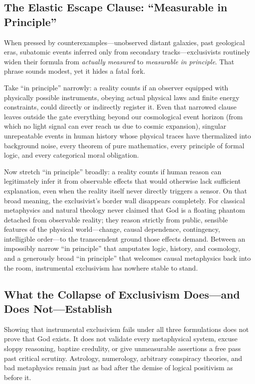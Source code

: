 \subsection{The Elastic Escape Clause: ``Measurable in Principle''}

When pressed by counterexamples---unobserved distant galaxies, past geological eras, subatomic events inferred only from secondary tracks---exclusivists routinely widen their formula from \emph{actually measured} to \emph{measurable in principle}. That phrase sounds modest, yet it hides a fatal fork.

Take ``in principle'' narrowly: a reality counts if an observer equipped with physically possible instruments, obeying actual physical laws and finite energy constraints, could directly or indirectly register it. Even that narrowed clause leaves outside the gate everything beyond our cosmological event horizon (from which no light signal can ever reach us due to cosmic expansion), singular unrepeatable events in human history whose physical traces have thermalized into background noise, every theorem of pure mathematics, every principle of formal logic, and every categorical moral obligation.

Now stretch ``in principle'' broadly: a reality counts if human reason can legitimately infer it from observable effects that would otherwise lack sufficient explanation, even when the reality itself never directly triggers a sensor. On that broad meaning, the exclusivist's border wall disappears completely. For classical metaphysics and natural theology never claimed that God is a floating phantom detached from observable reality; they reason strictly from public, sensible features of the physical world---change, causal dependence, contingency, intelligible order---to the transcendent ground those effects demand. Between an impossibly narrow ``in principle'' that amputates logic, history, and cosmology, and a generously broad ``in principle'' that welcomes causal metaphysics back into the room, instrumental exclusivism has nowhere stable to stand.

\subsection{What the Collapse of Exclusivism Does---and Does Not---Establish}

Showing that instrumental exclusivism fails under all three formulations does not prove that God exists. It does not validate every metaphysical system, excuse sloppy reasoning, baptize credulity, or give unmeasurable assertions a free pass past critical scrutiny. Astrology, numerology, arbitrary conspiracy theories, and bad metaphysics remain just as bad after the demise of logical positivism as before it.

